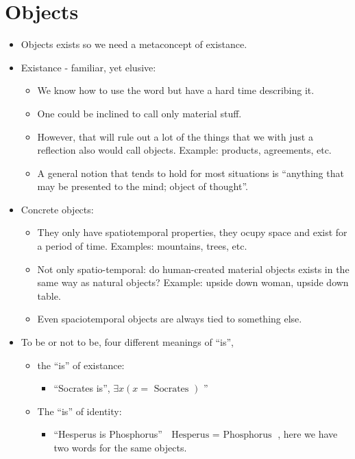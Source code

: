 \section{Objects}
\begin{itemize}
    \item Objects exists so we need a metaconcept of existance.
    \item Existance - familiar, yet elusive:
        \begin{itemize}
            \item We know how to use the word but have a hard time describing it.
            \item One could be inclined to call only material stuff.
            \item However, that will rule out a lot of the things that we with just a reflection also would call objects. Example: products, agreements, etc. 
            \item A general notion that tends to hold for most situations is ``anything that may be presented to the mind; object of thought''.
        \end{itemize}
    
    \item Concrete objects:
        \begin{itemize}
            \item They only have spatiotemporal properties, they ocupy space and exist for a period of time. Examples: mountains, trees, etc.
            \item Not only spatio-temporal: do human-created material objects exists in the same way as natural objects? Example: upside down woman, upside down table.
            \item Even spaciotemporal objects are always tied to something else.
        \end{itemize}
    
    \item To be or not to be, four different meanings of ``is'', 
        \begin{itemize}
            \item the ``is'' of existance:   
                \begin{itemize}
                    \item ``Socrates is'', $\exists x ( x= \text{ Socrates })$ ''
                \end{itemize}
            
            \item The ``is'' of identity: 
                \begin{itemize}
                    \item ``Hesperus is Phosphorus'' $\text{ Hesperus } = \text{ Phosphorus }$, here we have two words for the same objects.
                \end{itemize}
            

\end{itemize}
\end{itemize}

